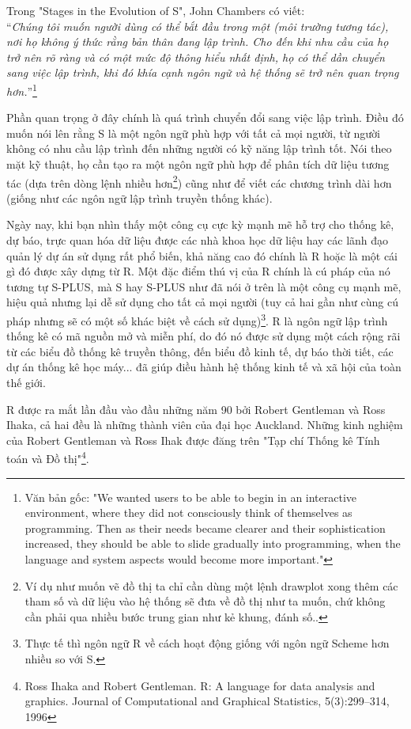 \documentclass{standalone} %
\begin{document}
        Trong "Stages in the Evolution of S", John Chambers có viết:\\
        ``\textit{Chúng tôi muốn người dùng có thể bắt đầu trong một (môi trường tương tác), nơi họ không ý thức rằng bản thân đang lập trình. Cho đến khi nhu cầu của họ trở nên rõ ràng và có một mức độ thông hiểu nhất định, họ có thể dần chuyển sang việc lập trình, khi đó khía cạnh ngôn ngữ và hệ thống sẽ trở nên quan trọng hơn.}''\footnote{Văn bản gốc: "We wanted users to be able to begin in an interactive environment, where they did not consciously think of themselves as programming. Then as their needs became clearer and their sophistication increased, they should be able to slide gradually into programming, when the language and system aspects would become more important."}
        
        Phần quan trọng ở đây chính là quá trình chuyển đổi sang việc lập trình. Điều đó muốn nói lên rằng S là một ngôn ngữ phù hợp với tất cả mọi người, từ người không có nhu cầu lập trình đến những người có kỹ năng lập trình tốt. Nói theo mặt kỹ thuật, họ cần tạo ra một ngôn ngữ phù hợp để phân tích dữ liệu tương tác (dựa trên dòng lệnh nhiều hơn\footnote{Ví dụ như muốn vẽ đồ thị ta chỉ cần dùng một lệnh drawplot xong thêm các tham số và dữ liệu vào hệ thống sẽ đưa về đồ thị như ta muốn, chứ không cần phải qua nhiều bước trung gian như kẻ khung, đánh số..}) cũng như để viết các chương trình dài hơn (giống như các ngôn ngữ lập trình truyền thống khác).
        
        Ngày nay, khi bạn nhìn thấy một công cụ cực kỳ mạnh mẽ hỗ trợ cho thống kê, dự báo, trực quan hóa dữ liệu được các nhà khoa học dữ liệu hay các lãnh đạo quản lý dự án sử dụng rất phổ biến, khả năng cao đó chính là R hoặc là một cái gì đó được xây dựng từ R. Một đặc điểm thú vị của R chính là cú pháp của nó tương tự S-PLUS, mà S hay S-PLUS như đã nói ở trên là một công cụ mạnh mẽ, hiệu quả nhưng lại dễ sử dụng cho tất cả mọi người (tuy cả hai gần như cùng cú pháp nhưng sẽ có một số khác biệt về cách sử dụng)\footnote{Thực tế thì ngôn ngữ R về cách hoạt động giống với ngôn ngữ Scheme hơn nhiều so với S.}. R là ngôn ngữ lập trình thống kê có mã nguồn mở và miễn phí, do đó nó được sử dụng một cách rộng rãi từ các biểu đồ thống kê truyền thông, đến biểu đồ kinh tế, dự báo thời tiết, các dự án thống kê học máy... đã giúp điều hành hệ thống kinh tế và xã hội của toàn thế giới. 
        
        R được ra mắt lần đầu vào đầu những năm 90 bởi Robert Gentleman và Ross Ihaka, cả hai đều là những thành viên của đại học Auckland. Những kinh nghiệm của Robert Gentleman và Ross Ihak được đăng trên "Tạp chí Thống kê Tính toán và Đồ thị"\footnote{Ross Ihaka and Robert Gentleman. R: A language for data analysis and graphics. Journal of Computational and Graphical Statistics, 5(3):299–314, 1996}.
        
\end{document}
